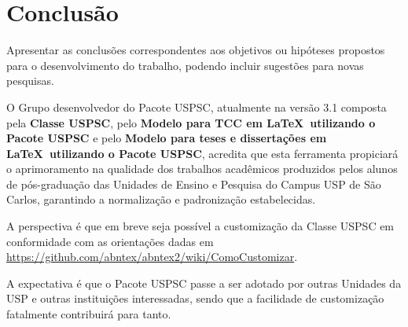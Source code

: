 \chapter{Conclusão}
Apresentar as conclusões correspondentes aos objetivos ou hipóteses propostos para o desenvolvimento do trabalho, podendo incluir  sugestões para novas pesquisas.

O Grupo desenvolvedor do Pacote USPSC, atualmente na versão 3.1 composta pela \textbf{Classe USPSC}, pelo \textbf{Modelo para TCC em \LaTeX\ utilizando o Pacote USPSC} e pelo \textbf{Modelo para teses e dissertações em \LaTeX\ utilizando o Pacote USPSC}, acredita que esta ferramenta propiciar\'a o aprimoramento na qualidade dos trabalhos acad\^emicos produzidos pelos alunos de pós-graduação das Unidades de Ensino e Pesquisa do Campus USP de São Carlos, garantindo a normalização e padronização estabelecidas.

A perspectiva \'e que em breve seja possível a customização da Classe USPSC em conformidade com as orientações dadas em \url{https://github.com/abntex/abntex2/wiki/ComoCustomizar}.

A expectativa \'e que o Pacote USPSC passe a ser adotado por outras Unidades da USP e outras instituições interessadas, sendo que a facilidade de customização fatalmente contribuir\'a para tanto.


